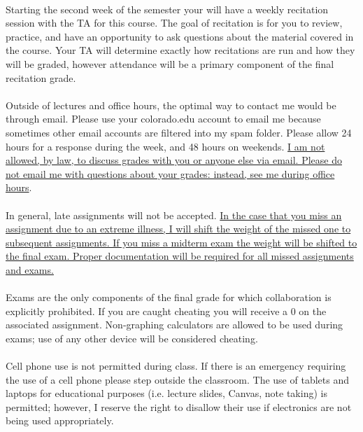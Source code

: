 \documentclass[11pt]{article}
\begin{document}
\\
Starting the second week of the semester your will have a weekly recitation session with the TA for this course.  The goal of recitation is for you to review, practice, and have an opportunity to ask questions about the material covered in the course.  Your TA will determine exactly how recitations are run and how they will be graded, however attendance will be a primary component of the final recitation grade.\\

\\
Outside of lectures and office hours, the optimal way to contact me would be through email.  Please use your colorado.edu account to email me because sometimes other email accounts are filtered into my spam folder.  Please allow 24 hours for a response during the week, and 48 hours on weekends.  \uline{I am not allowed, by law, to discuss grades with you or anyone else via email.  Please do not email me with questions about your grades: instead, see me during office hours}.\\

\\
In general, late assignments will not be accepted.  \uline{In the case that you miss an assignment due to an extreme illness, I will shift the weight of the missed one to subsequent assignments.  If you miss a midterm exam the weight will be shifted to the final exam.  Proper documentation will be required for all missed assignments and exams.}\\

\\
Exams are the only components of the final grade for which collaboration is explicitly prohibited.  If you are caught cheating you will receive a 0 on the associated assignment.  Non-graphing calculators are allowed to be used during exams; use of any other device will be considered cheating.\\

\\
Cell phone use is not permitted during class.  If there is an emergency requiring the use of a cell phone please step outside the classroom.  The use of tablets and laptops for educational purposes (i.e. lecture slides, Canvas, note taking) is permitted; however, I reserve the right to disallow their use if electronics are not being used appropriately.\\
\end{document}
